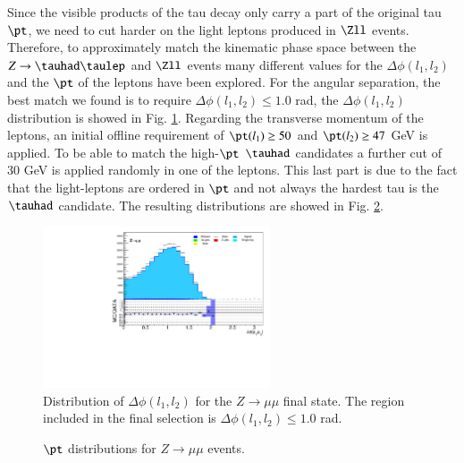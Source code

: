 Since the visible products of the tau decay only carry a part of the original tau $\pt$, we need to cut harder on the light leptons produced in $\Zll$ events. Therefore, to approximately match the kinematic phase space between the $Z\to\tauhad\taulep$ and $\Zll$ events many different values for the $\Delta\phi (l_1,l_2)$ and the $\pt$ of the leptons have been explored. For the angular separation, the best match we found is to require $\Delta\phi (l_1,l_2)\leq 1.0$ rad, the $\Delta\phi (l_1,l_2)$ distribution is showed in Fig. \ref{Fig8s}. Regarding the transverse momentum of the leptons, an initial offline requirement of $\pt(l_1)\geq 50$ and $\pt(l_2)\geq 47$ GeV is applied. To be able to match the high-$\pt$ $\tauhad$ candidates a further cut of 30 GeV is applied randomly in one of the leptons. This last part is due to the fact that the light-leptons are ordered in $\pt$ and not always the hardest tau is the $\tauhad$ candidate. The resulting distributions are showed in Fig. \ref{Fig9}.
\begin{figure}[htbp]	
	\centering
	\includegraphics[width=0.6\textwidth]{figures/Fig8.pdf}
	\caption{Distribution of $\Delta\phi (l_1,l_2)$ for the $Z\to\mu\mu$ final state. The region included in the final selection is $\Delta\phi (l_1,l_2)\leq 1.0$ rad.}
	\label{Fig8s}
\end{figure}
\begin{figure}[htbp]
	\centering
	\hfill
	\caption{$\pt$ distributions for $Z\to\mu\mu$ events.}
	\label{Fig9}
\end{figure}

